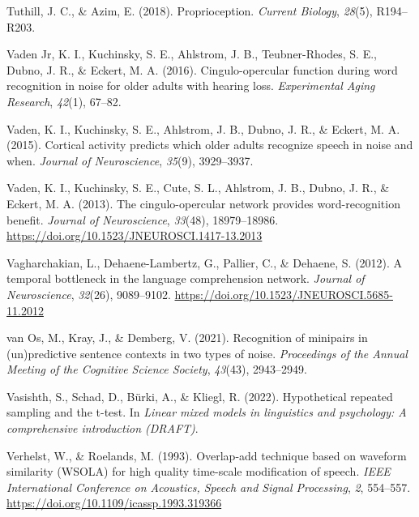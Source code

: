 \documentclass[a4paper, nobind]{templates/ociamthesis}
\newlength{\cslhangindent}
\newenvironment{CSLReferences}[2] %
 {%
  \setlength{\parindent}{0pt}
  \ifodd #1
  \let\oldpar\par
  \def\par{\hangindent=\cslhangindent\oldpar}
  \fi
  \setlength{\parskip}{1mm}
  \setlength{\baselineskip}{6mm}
 }%
 {}
\begin{document}
\begin{CSLReferences}{1}{0}
\leavevmode{}%
Tuthill, J. C., \& Azim, E. (2018). Proprioception. \emph{Current Biology}, \emph{28}(5), R194--R203.

\leavevmode{}%
Vaden Jr, K. I., Kuchinsky, S. E., Ahlstrom, J. B., Teubner-Rhodes, S. E., Dubno, J. R., \& Eckert, M. A. (2016). Cingulo-opercular function during word recognition in noise for older adults with hearing loss. \emph{Experimental Aging Research}, \emph{42}(1), 67--82.

\leavevmode{}%
Vaden, K. I., Kuchinsky, S. E., Ahlstrom, J. B., Dubno, J. R., \& Eckert, M. A. (2015). Cortical activity predicts which older adults recognize speech in noise and when. \emph{Journal of Neuroscience}, \emph{35}(9), 3929--3937.

\leavevmode{}%
Vaden, K. I., Kuchinsky, S. E., Cute, S. L., Ahlstrom, J. B., Dubno, J. R., \& Eckert, M. A. (2013). {The cingulo-opercular network provides word-recognition benefit}. \emph{Journal of Neuroscience}, \emph{33}(48), 18979--18986. \url{https://doi.org/10.1523/JNEUROSCI.1417-13.2013}

\leavevmode{}%
Vagharchakian, L., Dehaene-Lambertz, G., Pallier, C., \& Dehaene, S. (2012). {A temporal bottleneck in the language comprehension network}. \emph{Journal of Neuroscience}, \emph{32}(26), 9089--9102. \url{https://doi.org/10.1523/JNEUROSCI.5685-11.2012}

\leavevmode{}%
van Os, M., Kray, J., \& Demberg, V. (2021). {Recognition of minipairs in (un)predictive sentence contexts in two types of noise}. \emph{Proceedings of the Annual Meeting of the Cognitive Science Society}, \emph{43}(43), 2943--2949.

\leavevmode{}%
Vasishth, S., Schad, D., Bürki, A., \& Kliegl, R. (2022). Hypothetical repeated sampling and the t-test. In \emph{Linear mixed models in linguistics and psychology: A comprehensive introduction (DRAFT)}.

\leavevmode{}%
Verhelst, W., \& Roelands, M. (1993). {Overlap-add technique based on waveform similarity (WSOLA) for high quality time-scale modification of speech}. \emph{IEEE International Conference on Acoustics, Speech and Signal Processing}, \emph{2}, 554--557. \url{https://doi.org/10.1109/icassp.1993.319366}


\end{CSLReferences}
\end{document}
